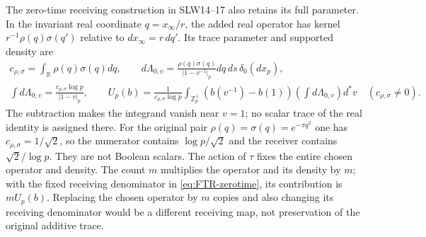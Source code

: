 The zero-time receiving construction in SLW14--17 also retains
its full parameter. In the invariant real coordinate
$q=x_\infty/r$, the added real operator has kernel
$r^{-1}\rho(q)\sigma(q')$ relative to
$dx_\infty=r\,dq'$. Its trace parameter and supported density are
\begin{equation}\tag{FTR15}\label{eq:FTR-zerotime}
 \begin{gathered}
 c_{\rho,\sigma}=\int_{\mathbb R}\rho(q)\sigma(q)dq,\qquad
 d\Lambda_{0,v}=
  \frac{\rho(q)\sigma(q)}{|1-v^{-1}|_p}
          dq\,ds\,\delta_0(dx_p),\\
 \int d\Lambda_{0,v}
       =\frac{c_{\rho,\sigma}\log p}{|1-v|_p},\qquad
 U_p(b)=\frac1{c_{\rho,\sigma}\log p}
       \int_{\mathbb Z_p^\times}
       (b(v^{-1})-b(1))\left(\int d\Lambda_{0,v}\right)d^*v
 \quad(c_{\rho,\sigma}\ne0).
 \end{gathered}
\end{equation}
The subtraction makes the integrand vanish near $v=1$; no scalar
trace of the real identity is assigned there. For the original
pair $\rho(q)=\sigma(q)=e^{-\pi q^2}$ one has
$c_{\rho,\sigma}=1/\sqrt2$, so the numerator contains
$\log p/\sqrt2$ and the receiver contains
$\sqrt2/\log p$. They are not Boolean scalars.
The action of $\tau$ fixes the entire chosen operator and density.
The count $m$ multiplies the operator and its density by $m$;
with the fixed receiving denominator in
\eqref{eq:FTR-zerotime}, its contribution is $mU_p(b)$.
Replacing the chosen operator by $m$ copies and also changing
its receiving denominator would be a different receiving map,
not preservation of the original additive trace.


